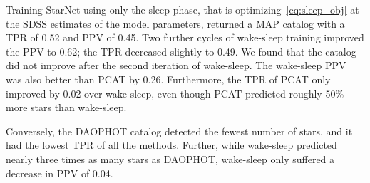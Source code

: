 Training StarNet using only the sleep phase, that is optimizing~\eqref{eq:sleep_obj} at the SDSS estimates of the model parameters, returned 
a MAP catalog with a TPR of 0.52 and PPV of 0.45. Two further cycles of wake-sleep training improved the PPV to 0.62; the TPR decreased slightly to 0.49. We found that the catalog did not improve after the second iteration of wake-sleep. The wake-sleep PPV was also better than PCAT by 0.26. Furthermore, the TPR of PCAT
only improved by 0.02 over wake-sleep, even though PCAT predicted roughly 50\% more stars than wake-sleep. 





Conversely, the DAOPHOT catalog detected the fewest number of stars, and it had the lowest TPR of all the methods.
Further, while wake-sleep predicted nearly three times as many stars as DAOPHOT, wake-sleep only suffered a decrease in PPV of 0.04. 




